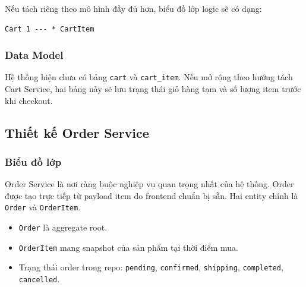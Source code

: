 \documentclass[12pt,a4paper]{article}
\begin{document}
Nếu tách riêng theo mô hình đầy đủ hơn, biểu đồ lớp logic sẽ có dạng:

\begin{lstlisting}[style=code,caption={Mô hình logic Cart Service}]
Cart 1 --- * CartItem
\end{lstlisting}

\subsubsection{Data Model}
Hệ thống hiện chưa có bảng \texttt{cart} và \texttt{cart\_item}. Nếu mở rộng theo hướng tách Cart Service, hai bảng này sẽ lưu trạng thái giỏ hàng tạm và số lượng item trước khi checkout.

\subsection{Thiết kế Order Service}
\subsubsection{Biểu đồ lớp}
Order Service là nơi ràng buộc nghiệp vụ quan trọng nhất của hệ thống. Order được tạo trực tiếp từ payload item do frontend chuẩn bị sẵn. Hai entity chính là \texttt{Order} và \texttt{OrderItem}.

\begin{itemize}
  \item \texttt{Order} là aggregate root.
  \item \texttt{OrderItem} mang snapshot của sản phẩm tại thời điểm mua.
  \item Trạng thái order trong repo: \texttt{pending}, \texttt{confirmed}, \texttt{shipping}, \texttt{completed}, \texttt{cancelled}.
\end{itemize}
\end{document}
